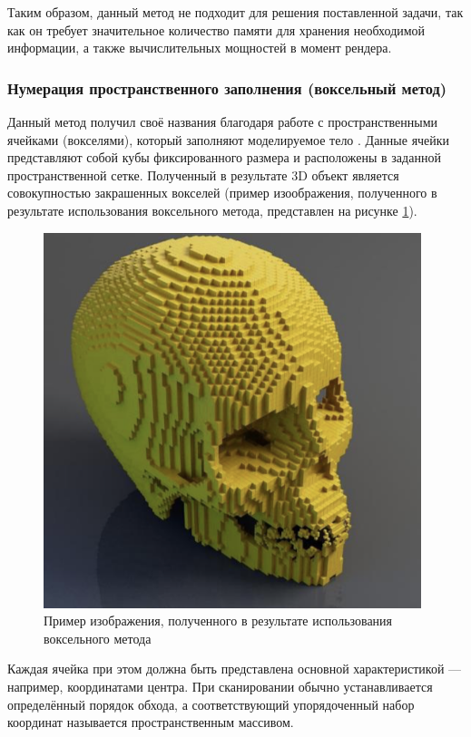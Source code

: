 Таким образом, данный метод не подходит для решения поставленной 
задачи, так как он требует значительное количество памяти для хранения 
необходимой информации, а также вычислительных мощностей в момент 
рендера.

\subsubsection{Нумерация пространственного заполнения (воксельный метод)} \label{sec:numeric}

Данный метод получил своё названия благодаря работе с 
пространственными ячейками (вокселями), который заполняют моделируемое 
тело \cite{numeric-octree}.
Данные ячейки представляют собой кубы фиксированного размера и 
расположены в заданной пространственной сетке.
Полученный в результате 3D 
объект является совокупностью закрашенных вокселей (пример изоображения, полученного в результате использования воксельного метода, представлен на рисунке \ref{fig:numeric}). 

\begin{figure}[h]
	\centering
	\captionsetup{justification=centering}
	\includegraphics[width=110mm]{img/numeric.png}
	\caption{Пример изображения, полученного в результате 
		использования воксельного метода}
	\label{fig:numeric}
\end{figure}

Каждая ячейка при этом должна быть представлена основной 
характеристикой --- например, координатами центра.
При сканировании 
обычно устанавливается определённый порядок обхода, а соответствующий 
упорядоченный набор координат называется пространственным массивом.

